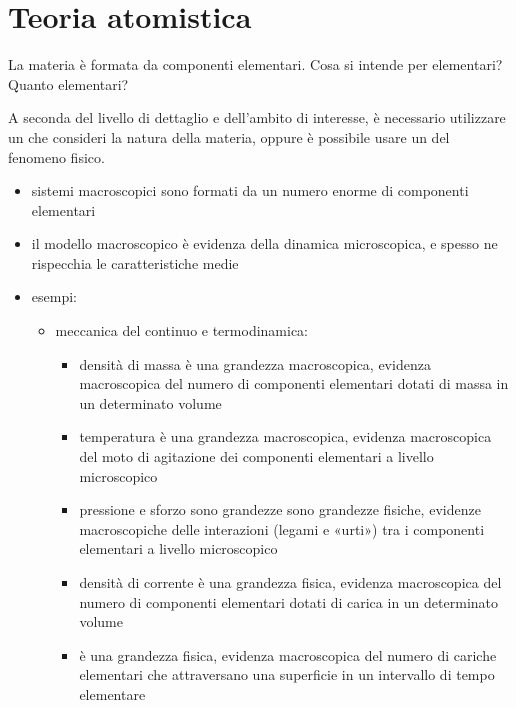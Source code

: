 \documentclass[letterpaper,10pt,italian]{jupyterBook}
\begin{document}
\section{Teoria atomistica}
\label{\detokenize{ch/intro/current-status:teoria-atomistica}}\label{\detokenize{ch/intro/current-status:physics-hs-intro-current-status-micro-macro}}
\sphinxAtStartPar
La materia è formata da componenti elementari. Cosa si intende per elementari? Quanto elementari?

\sphinxAtStartPar
A seconda del livello di dettaglio e dell’ambito di interesse, è necessario utilizzare un  che consideri la natura  della materia, oppure è possibile usare un   del fenomeno fisico.
\begin{itemize}
\item {} 
\sphinxAtStartPar
sistemi macroscopici sono formati da un numero enorme di componenti elementari

\item {} 
\sphinxAtStartPar
il modello macroscopico è evidenza della dinamica microscopica, e spesso ne rispecchia le caratteristiche medie

\item {} 
\sphinxAtStartPar
esempi:
\begin{itemize}
\item {} 
\sphinxAtStartPar
meccanica del continuo e termodinamica:
\begin{itemize}
\item {} 
\sphinxAtStartPar
densità di massa è una grandezza macroscopica, evidenza macroscopica del numero di componenti elementari dotati di massa in un determinato volume

\item {} 
\sphinxAtStartPar
temperatura è una grandezza macroscopica, evidenza macroscopica del moto di agitazione dei componenti elementari a livello microscopico

\item {} 
\sphinxAtStartPar
pressione e sforzo sono grandezze sono grandezze fisiche, evidenze macroscopiche delle interazioni (legami e «urti») tra i componenti elementari a livello microscopico

\item {} 
\sphinxAtStartPar
densità di corrente è una grandezza fisica, evidenza macroscopica del numero di componenti elementari dotati di carica in un determinato volume

\item {} 
\sphinxAtStartPar
{\hyperref[\detokenize{ch/electromagnetism/electric-current:physics-hs-electromagnetism-electric-current}]{}} è una grandezza fisica, evidenza macroscopica del numero di cariche elementari che attraversano una superficie in un intervallo di tempo elementare

\end{itemize}

\end{itemize}

\end{itemize}
\end{document}
